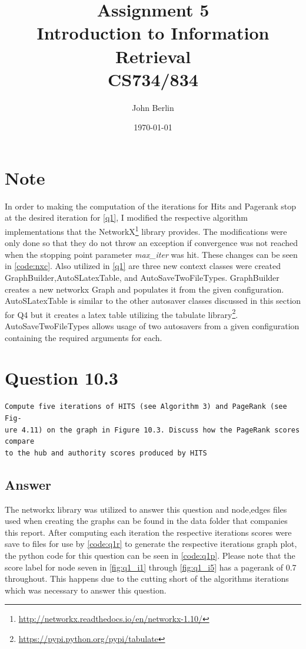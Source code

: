 \documentclass[11pt]{article}
\title{Assignment 5 \\ Introduction to Information Retrieval \\ CS734/834}
\author{John Berlin}
\date{\today}
\begin{document}
\maketitle
\newpage
\section*{Note}
In order to making the computation of the iterations for Hits and Pagerank stop at the desired iteration for \autoref{q1}, I modified the respective algorithm implementations that the NetworkX\footnote{\href{http://networkx.readthedocs.io/en/networkx-1.10/}{http://networkx.readthedocs.io/en/networkx-1.10/}} library provides. The modifications were only done so that they do not throw an exception if convergence was not reached when the stopping point parameter \textit{max\_iter} was hit.  These changes can be seen in \autoref{code:nxc}. Also utilized in \autoref{q1} are three new context classes were created GraphBuilder,AutoSLatexTable, and AutoSaveTwoFileTypes. GraphBuilder creates a new networkx Graph and populates it from the given configuration. 
AutoSLatexTable is similar to the other autosaver classes discussed in this section for Q4 but it creates a latex table utilizing the tabulate library\footnote{\href{https://pypi.python.org/pypi/tabulate}{https://pypi.python.org/pypi/tabulate}}. AutoSaveTwoFileTypes allows usage of two autosavers from a given configuration containing the required arguments for each.
\newpage
\section{Question 10.3} \label{q1}
\begin{verbatim}
Compute five iterations of HITS (see Algorithm 3) and PageRank (see Fig-
ure 4.11) on the graph in Figure 10.3. Discuss how the PageRank scores compare
to the hub and authority scores produced by HITS
\end{verbatim}
\subsection*{Answer} 
The networkx library was utilized to answer this question and node,edges files used when creating the graphs can be found in the data folder that companies this report. After computing each iteration the respective iterations scores were save to files for use by \autoref{code:q1r} to generate the respective iterations graph plot, the python code for this question can be seen in \autoref{code:q1p}. Please note that the score label for node seven in  \autoref{fig:q1_i1} through \autoref{fig:q1_i5} has a pagerank of 0.7 throughout. This happens due to the cutting short of the algorithms iterations which was necessary to answer this question.  
\end{document}
